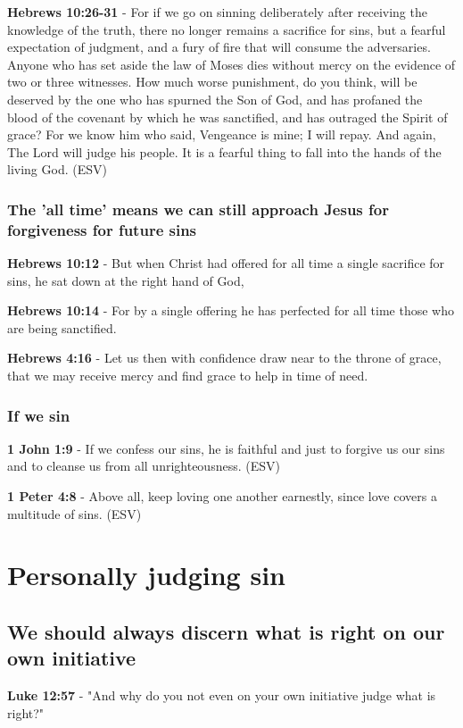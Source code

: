 \documentclass[11pt]{article}
\begin{document}
\textbf{Hebrews 10:26-31} - For if we go on sinning deliberately after receiving the knowledge of the truth, there no longer remains a sacrifice for sins, but a fearful expectation of judgment, and a fury of fire that will consume the adversaries. Anyone who has set aside the law of Moses dies without mercy on the evidence of two or three witnesses. How much worse punishment, do you think, will be deserved by the one who has spurned the Son of God, and has profaned the blood of the covenant by which he was sanctified, and has outraged the Spirit of grace? For we know him who said, Vengeance is mine; I will repay. And again, The Lord will judge his people. It is a fearful thing to fall into the hands of the living God. (ESV)

\subsubsection{The 'all time' means we can still approach Jesus for forgiveness for future sins}
\label{sec:org11dc2cb}
\textbf{Hebrews 10:12} - But when Christ had offered for all time a single sacrifice for sins, he sat down at the right hand of God,

\textbf{Hebrews 10:14} - For by a single offering he has perfected for all time those who are being sanctified.

\textbf{Hebrews 4:16} - Let us then with confidence draw near to the throne of grace, that we may receive mercy and find grace to help in time of need.

\subsubsection{If we sin}
\label{sec:orge3052a8}
\textbf{1 John 1:9} -  If we confess our sins, he is faithful and just to forgive us our sins and to cleanse us from all unrighteousness.  (ESV)

\textbf{1 Peter 4:8} -  Above all, keep loving one another earnestly, since love covers a multitude of sins.  (ESV)

\section{Personally judging sin}
\label{sec:org36c6b4a}
\subsection{We should always discern what is right on our own initiative}
\label{sec:org2a6bffd}
\textbf{Luke 12:57} - "And why do you not even on your own initiative judge what is right?"
\end{document}
